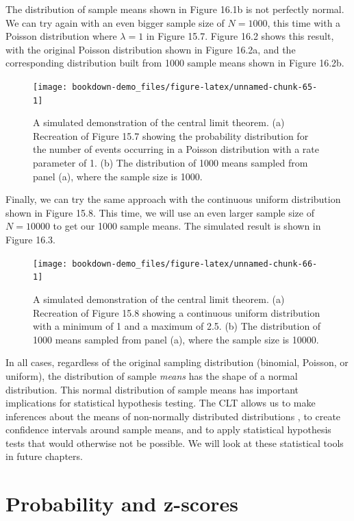 \documentclass[
]{scrbook}
\begin{document}
The distribution of sample means shown in Figure 16.1b is not perfectly normal.
We can try again with an even bigger sample size of \(N = 1000\), this time with a Poisson distribution where \(\lambda = 1\) in Figure 15.7.
Figure 16.2 shows this result, with the original Poisson distribution shown in Figure 16.2a, and the corresponding distribution built from 1000 sample means shown in Figure 16.2b.

\begin{figure}
\texttt{[image: bookdown-demo\_files/figure-latex/unnamed-chunk-65-1]} \caption{A simulated demonstration of the central limit theorem. (a) Recreation of Figure 15.7 showing the probability distribution for the number of events occurring in a Poisson distribution with a rate parameter of 1. (b) The distribution of 1000 means sampled from panel (a), where the sample size is 1000.}\label{fig:unnamed-chunk-65}
\end{figure}

Finally, we can try the same approach with the continuous uniform distribution shown in Figure 15.8.
This time, we will use an even larger sample size of \(N = 10000\) to get our 1000 sample means.
The simulated result is shown in Figure 16.3.

\begin{figure}
\texttt{[image: bookdown-demo\_files/figure-latex/unnamed-chunk-66-1]} \caption{A simulated demonstration of the central limit theorem. (a) Recreation of Figure 15.8 showing a continuous uniform distribution with a minimum of 1 and a maximum of 2.5. (b) The distribution of 1000 means sampled from panel (a), where the sample size is 10000.}\label{fig:unnamed-chunk-66}
\end{figure}

In all cases, regardless of the original sampling distribution (binomial, Poisson, or uniform), the distribution of sample \emph{means} has the shape of a normal distribution.
This normal distribution of sample means has important implications for statistical hypothesis testing.
The CLT allows us to make inferences about the means of non-normally distributed distributions \citep{Sokal1995}, to create confidence intervals around sample means, and to apply statistical hypothesis tests that would otherwise not be possible.
We will look at these statistical tools in future chapters.

\hypertarget{probability-and-z-scores}{%
\section{Probability and z-scores}\label{probability-and-z-scores}}
\end{document}
